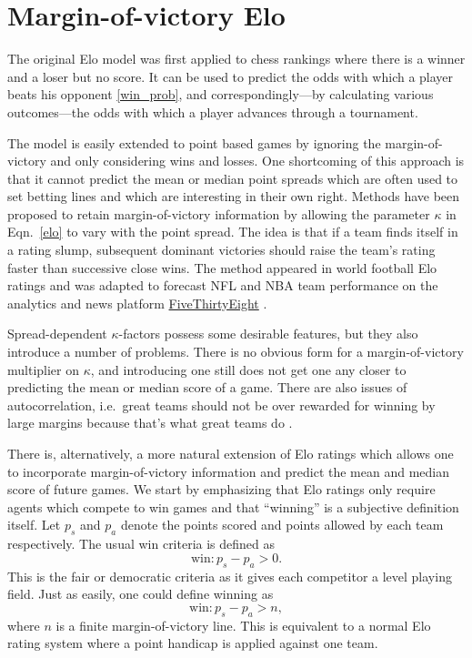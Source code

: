 \documentclass[aps,prc,reprint,amsmath,superscriptaddress]{revtex4-1}
\begin{document}
\section{Margin-of-victory Elo}

The original Elo model was first applied to chess rankings where there is a winner and a loser but no score.
It can be used to predict the odds with which a player beats his opponent \eqref{win_prob}, and correspondingly---by calculating various outcomes---the odds with which a player advances through a tournament. 

The model is easily extended to point based games by ignoring the margin-of-victory and only considering wins and losses.
One shortcoming of this approach is that it cannot predict the mean or median point spreads which are often used to set betting lines and which are interesting in their own right.
Methods have been proposed to retain margin-of-victory information by allowing the parameter $\kappa$ in Eqn.~\eqref{elo} to vary with the point spread.
The idea is that if a team finds itself in a rating slump, subsequent dominant victories should raise the team's rating faster than successive close wins.
The method appeared in world football Elo ratings \cite{footballratings} and was adapted to forecast NFL and NBA team performance on the analytics and news platform \href{www.fivethirtyeight.com}{FiveThirtyEight} \cite{538NFL, 538NBA}.

Spread-dependent $\kappa$-factors possess some desirable features, but they also introduce a number of problems.
There is no obvious form for a margin-of-victory multiplier on $\kappa$, and introducing one still does not get one any closer to predicting the mean or median score of a game.
There are also issues of autocorrelation, i.e.\ great teams should not be over rewarded for winning by large margins because that's what great teams do \cite{538NFL}.

There is, alternatively, a more natural extension of Elo ratings which allows one to incorporate margin-of-victory information and predict the mean and median score of future games.
We start by emphasizing that Elo ratings only require agents which compete to win games and that ``winning'' is a subjective definition itself.
Let $p_s$ and $p_a$ denote the points scored and points allowed by each team respectively.
The usual win criteria is defined as
\begin{equation}
  \text{win}: p_s - p_a > 0.
\end{equation}
This is the fair or democratic criteria as it gives each competitor a level playing field.
Just as easily, one could define winning as
\begin{equation}
  \text{win}: p_s - p_a > n,
\end{equation}
where $n$ is a finite margin-of-victory line.
This is equivalent to a normal Elo rating system where a point handicap is applied against one team.
\end{document}
